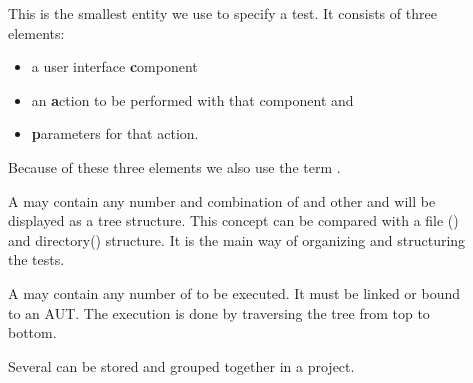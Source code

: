 \begin{description}
\item[\gdstep] 
This is the smallest entity we use to specify a test.
It consists of three elements:
\begin{itemize}
\item a user interface \textbf{c}omponent
\item an \textbf{a}ction  to be performed with that component and 
\item \textbf{p}arameters for that action.
\end{itemize}
Because of these three elements we also use the term .

\item[\gdcase]
A \gdcase may contain 
any number and combination of \gdsteps and
other \gdcases and will be displayed as a tree structure. This concept can be compared
with a file (\gdstep) and directory(\gdcase) structure. 
It is the main way of organizing and structuring the
tests. 

\item[\gdsuite] 
A \gdsuite may contain any number of \gdcases to be executed.
It must be linked or bound to an AUT. The execution is done by traversing
the tree from top to bottom.

\item[] 
Several \gdsuites can be stored and grouped together
in a project. 

\end{description}